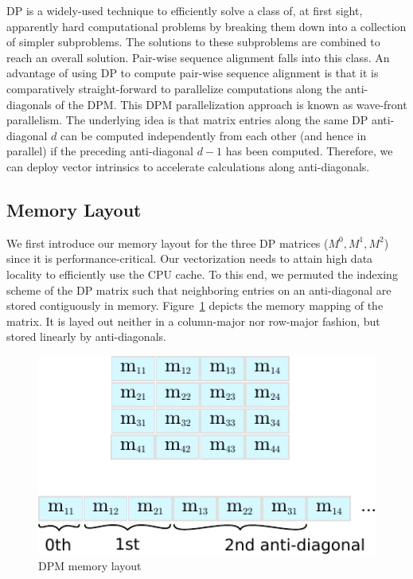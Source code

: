 \documentclass[runningheads,a4paper]{llncs}
\begin{document}
DP is a widely-used technique to efficiently solve a class of, at first sight, apparently hard computational problems by breaking them down
into a collection of simpler subproblems. The solutions to these subproblems are combined to reach an overall solution.
Pair-wise sequence alignment falls into this class.
An advantage of using DP to compute pair-wise sequence alignment is that it is comparatively straight-forward to parallelize computations along the anti-diagonals
of the DPM.
This DPM parallelization approach is known as wave-front parallelism.
The underlying idea is that matrix entries along the same DP anti-diagonal $d$ can be computed independently from each other (and hence in parallel)
if the preceding anti-diagonal $d-1$ has been computed.
Therefore, we can deploy vector intrinsics to accelerate calculations along anti-diagonals.


\subsection{Memory Layout}
\label{ssec:memorylayout}

We first introduce our memory layout for the three DP matrices ($M^0, M^1, M^2$) since it is performance-critical.
Our vectorization needs to attain high data locality to efficiently use the CPU cache.
To this end,  we permuted the indexing scheme of the DP matrix such that neighboring entries on an anti-diagonal are stored contiguously in memory.
Figure~\ref{fig:indexing} depicts the memory mapping of the matrix.
It is layed out neither in a column-major nor row-major fashion, but stored linearly by anti-diagonals.

\begin{figure}[ht!]
  \centering
  \includegraphics[scale=0.9]{figures/indexing.pdf}
  \caption{DPM memory layout}
  \label{fig:indexing}
\end{figure}
\end{document}
